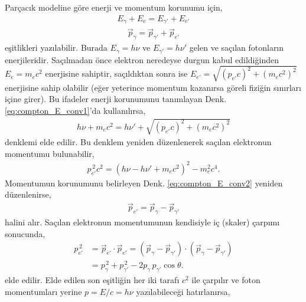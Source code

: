 \documentclass[a4paper,12pt, twoside]{article}
\begin{document}
Parçacık modeline göre enerji ve momentum korunumu için,
\begin{align}
\label{eq:compton_E_conv1}
E_\gamma + E_e = E_{\gamma'} + E_{e'}
\end{align}
\begin{align}
\label{eq:compton_E_conv2}
\vec{p}_\gamma = \vec{p}_{\gamma'} + \vec{p}_{e'}
\end{align}
eşitlikleri yazılabilir. Burada $E_{\gamma} = h\nu$ ve $E_{\gamma'} = h\nu'$ gelen ve saçılan fotonların enerjileridir. Saçılmadan önce elektron neredeyse durgun kabul edildiğinden $E_e = m_ec^2$ enerjisine sahiptir, saçıldıktan sonra ise $E_{e'} = \sqrt{(p_{e'}c)^2 + (m_ec^2)^2}$ enerjisine sahip olabilir (eğer yeterince momentum kazanırsa göreli fiziğin sınırları içine girer). Bu ifadeler  enerji korunumunu tanımlayan Denk. \ref{eq:compton_E_conv1}'da kullanılırsa,
\begin{align}
\label{eq:compton_E_conv3}
h\nu + m_e c^2 = h\nu' + \sqrt{(p_{e'}c)^2 + (m_e c^2)^2}
\end{align}
\noindent denklemi elde edilir. Bu denklem yeniden düzenlenerek saçılan elektronun momentumu bulunabilir,
\begin{align}
\label{eq:compton_E_conv4}
p_{e'}^{\, 2}c^2 = (h\nu - h\nu' + m_{e}c^2)^2-m_{e}^2c^4.
\end{align}
Momentumun korunumunu belirleyen Denk. \ref{eq:compton_E_conv2} yeniden düzenlenirse,
\begin{align}
\label{eq:compton_E_conv5}
\vec{p}_{e'} = \vec{p}_\gamma - \vec{p}_{\gamma'}
\end{align}
halini alır. Saçılan elektronun momentumunun kendisiyle iç (skaler) çarpımı sonucunda,
\begin{align}
\label{eq:compton_E_conv6}
p_{e'}^{\, 2} &= \vec{p}_{e'}\cdot\vec{p}_{e'} = (\vec{p}_\gamma - \vec{p}_{\gamma'}) \cdot (\vec{p}_\gamma - \vec{p}_{\gamma'}) \\
&= p_{\gamma}^{\, 2} + p_{\gamma'}^{\, 2} - 2 p_{\gamma}\, p_{\gamma'} \cos\theta. 
\end{align}
elde edilir. Elde edilen son eşitliğin her iki tarafı $c^2$ ile çarpılır ve foton momentumları yerine $p = E/c = h\nu$ yazılabileceği hatırlanırsa,
\end{document}
